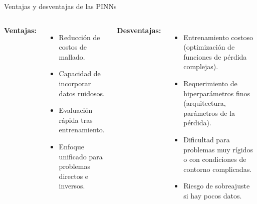 \begin{frame}{Ventajas y desventajas de las PINNs}
  \begin{columns}
    \textbf{Ventajas:}
    \begin{itemize}
      \item Reducción de costos de mallado.
      \item Capacidad de incorporar datos ruidosos.
      \item Evaluación rápida tras entrenamiento.
      \item Enfoque unificado para problemas directos e inversos.
    \end{itemize}
    \textbf{Desventajas:}
    \begin{itemize}
      \item Entrenamiento costoso (optimización de funciones de pérdida complejas).
      \item Requerimiento de hiperparámetros finos (arquitectura, parámetros de la pérdida).
      \item Dificultad para problemas muy rígidos o con condiciones de contorno complicadas.
      \item Riesgo de sobreajuste si hay pocos datos.
    \end{itemize}
  \end{columns}
\end{frame}

